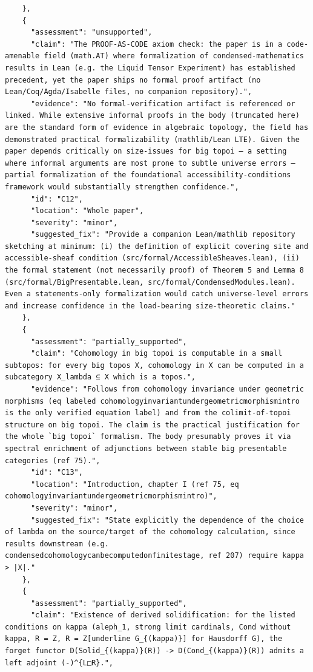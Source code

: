 \documentclass[11pt]{article}
\begin{document}
\begin{verbatim}
    },
    {
      "assessment": "unsupported",
      "claim": "The PROOF-AS-CODE axiom check: the paper is in a code-amenable field (math.AT) where formalization of condensed-mathematics results in Lean (e.g. the Liquid Tensor Experiment) has established precedent, yet the paper ships no formal proof artifact (no Lean/Coq/Agda/Isabelle files, no companion repository).",
      "evidence": "No formal-verification artifact is referenced or linked. While extensive informal proofs in the body (truncated here) are the standard form of evidence in algebraic topology, the field has demonstrated practical formalizability (mathlib/Lean LTE). Given the paper depends critically on size-issues for big topoi — a setting where informal arguments are most prone to subtle universe errors — partial formalization of the foundational accessibility-conditions framework would substantially strengthen confidence.",
      "id": "C12",
      "location": "Whole paper",
      "severity": "minor",
      "suggested_fix": "Provide a companion Lean/mathlib repository sketching at minimum: (i) the definition of explicit covering site and accessible-sheaf condition (src/formal/AccessibleSheaves.lean), (ii) the formal statement (not necessarily proof) of Theorem 5 and Lemma 8 (src/formal/BigPresentable.lean, src/formal/CondensedModules.lean). Even a statements-only formalization would catch universe-level errors and increase confidence in the load-bearing size-theoretic claims."
    },
    {
      "assessment": "partially_supported",
      "claim": "Cohomology in big topoi is computable in a small subtopos: for every big topos X, cohomology in X can be computed in a subcategory X_lambda ⊆ X which is a topos.",
      "evidence": "Follows from cohomology invariance under geometric morphisms (eq labeled cohomologyinvariantundergeometricmorphismintro is the only verified equation label) and from the colimit-of-topoi structure on big topoi. The claim is the practical justification for the whole `big topoi` formalism. The body presumably proves it via spectral enrichment of adjunctions between stable big presentable categories (ref 75).",
      "id": "C13",
      "location": "Introduction, chapter I (ref 75, eq cohomologyinvariantundergeometricmorphismintro)",
      "severity": "minor",
      "suggested_fix": "State explicitly the dependence of the choice of lambda on the source/target of the cohomology calculation, since results downstream (e.g. condensedcohomologycanbecomputedonfinitestage, ref 207) require kappa > |X|."
    },
    {
      "assessment": "partially_supported",
      "claim": "Existence of derived solidification: for the listed conditions on kappa (aleph_1, strong limit cardinals, Cond without kappa, R = Z, R = Z[underline G_{(kappa)}] for Hausdorff G), the forget functor D(Solid_{(kappa)}(R)) -> D(Cond_{(kappa)}(R)) admits a left adjoint (-)^{L□R}.",

\end{verbatim}
\end{document}
